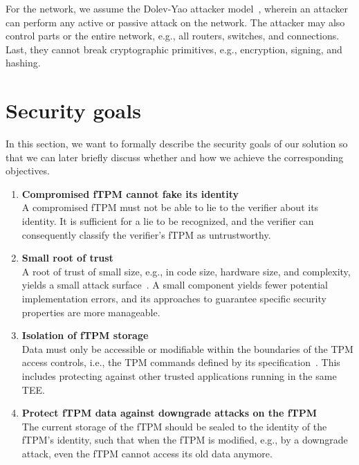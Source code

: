 For the network, we assume the Dolev-Yao attacker model~\cite{Dolev1983}, wherein an attacker can perform any active or passive attack on the network.
The attacker may also control parts or the entire network, e.g., all routers, switches, and connections.
Last, they cannot break cryptographic primitives, e.g., encryption, signing, and hashing.

\section{Security goals}

In this section, we want to formally describe the security goals of our solution so that we can later briefly discuss whether and how we achieve the corresponding objectives.

\begin{enumerate}[label=\textbf{SG-\arabic*}]
  \item{\textbf{Compromised fTPM cannot fake its identity}\\
  A compromised fTPM must not be able to lie to the verifier about its identity.
  It is sufficient for a lie to be recognized, and the verifier can consequently classify the verifier's fTPM as untrustworthy.}\label{sg:1}

  \item{\textbf{Small root of trust}\\
  A root of trust of small size, e.g., in code size, hardware size, and complexity, yields a small attack surface~\cite{Singaravelu2006}.
  A small component yields fewer potential implementation errors, and its approaches to guarantee specific security properties are more manageable.}\label{sg:2}
  
  \item{\textbf{Isolation of fTPM storage}\\
  Data must only be accessible or modifiable within the boundaries of the TPM access controls, i.e., the TPM commands defined by its specification~\cite{tpm20}.
  This includes protecting against other trusted applications running in the same \ac{TEE}\@.}\label{sg:3}
  
  \item{\textbf{Protect fTPM data against downgrade attacks on the fTPM}\\
  The current storage of the fTPM should be sealed to the identity of the fTPM's identity, such that when the fTPM is modified, e.g., by a downgrade attack, even the fTPM cannot access its old data anymore.}\label{sg:4}

\end{enumerate}

